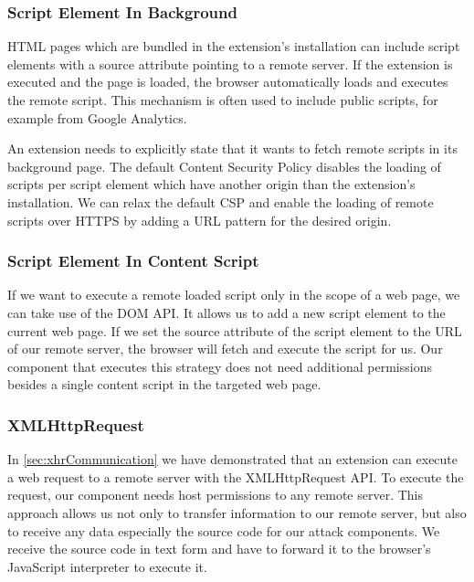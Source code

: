 \subsubsection{Script Element In Background}
\label{sec:scriptElementInBackground}
	
	HTML pages which are bundled in the extension's installation can include script elements with a source attribute pointing to a remote server. If the extension is executed and the page is loaded, the browser automatically loads and executes the remote script. This mechanism is often used to include public scripts, for example from Google Analytics. 
	
	An extension needs to explicitly state that it wants to fetch remote scripts in its background page. The default Content Security Policy disables the loading of scripts per script element which have another origin than the extension's installation. We can relax the default CSP and enable the loading of remote scripts over HTTPS by adding a URL pattern for the desired origin. 
	
\subsubsection{Script Element In Content Script}
\label{sec:scriptElementInContentScript}

	If we want to execute a remote loaded script only in the scope of a web page, we can take use of the DOM API. It allows us to add a new script element to the current web page. If we set the source attribute of the script element to the URL of our remote server, the browser will fetch and execute the script for us. Our component that executes this strategy does not need additional permissions besides a single content script in the targeted web page. 
	
\subsubsection{XMLHttpRequest}
\label{sec:xhrFetching}

	In \autoref{sec:xhrCommunication} we have demonstrated that an extension can execute a web request to a remote server with the XMLHttpRequest API. To execute the request, our component needs host permissions to any remote server. This approach allows us not only to transfer information to our remote server, but also to receive any data especially the source code for our attack components. We receive the source code in text form and have to forward it to the browser's JavaScript interpreter to execute it.
	
